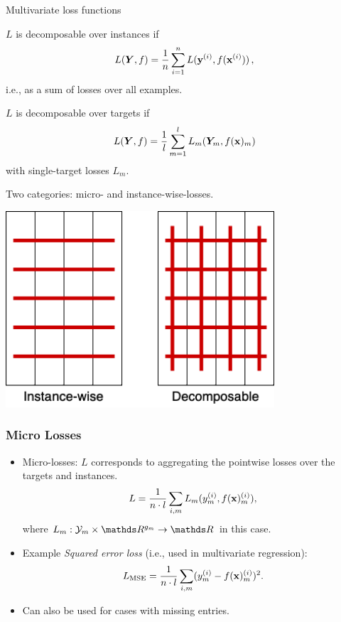 \documentclass[11pt,compress,t,notes=noshow, xcolor=table]{beamer}
\begin{document}
\begin{frame}{Multivariate loss functions}
	\begin{itemize}
		\item $L$ is decomposable over instances if
		$$
		L(\bm{Y}, f) = \frac{1}{n} \sum_{i=1}^n L(\mathbf{y}^{(i)}, f(\mathbf{x}^{(i)})) 
		\, ,
		$$
		i.e., as a sum of losses over all examples. 
		
		
		\item $L$ is decomposable over targets if
		$$
		L(\bm{Y}, f) = \frac{1}{l} \sum_{m=1}^l L_m(\bm{Y}_m, f(\mathbf{x})_m) 
		$$
		with single-target losses $L_m$. 
		
%		

		\begin{minipage}{0.45\textwidth}
%			
			\item Two categories: micro- and instance-wise-losses. 
%			
		\end{minipage}
%	
		\begin{minipage}{0.45\textwidth}
			\begin{center}
				\includegraphics[width=0.75\textwidth]{figure/fmeasure}
			\end{center}
		\end{minipage}

	\end{itemize}

\end{frame}




\begin{frame}
	\frametitle{Micro Losses}
	\begin{itemize}

        \item Micro-losses: $L$ corresponds to aggregating the pointwise losses over the targets and instances.
    	$$
    	L =  \frac{1}{n \cdot l} \sum_{i,m} L_m(y_m^{(i)} , f(\mathbf{x})_m^{(i)}),
    	$$
    	where $L_m: \Yspace_m \times \R^{g_m} \to \R$ in this case.      
     
		\item Example \emph{Squared error loss} (i.e., used in multivariate regression):
		$$
		L_{\text{MSE}} = \frac{1}{n \cdot l}\sum_{i, m} (y_m^{(i)} - f(\mathbf{x})_m^{(i)})^2.
		$$
        \item Can also be used for cases with missing entries.
		
	\end{itemize}
\end{frame}
\end{document}
